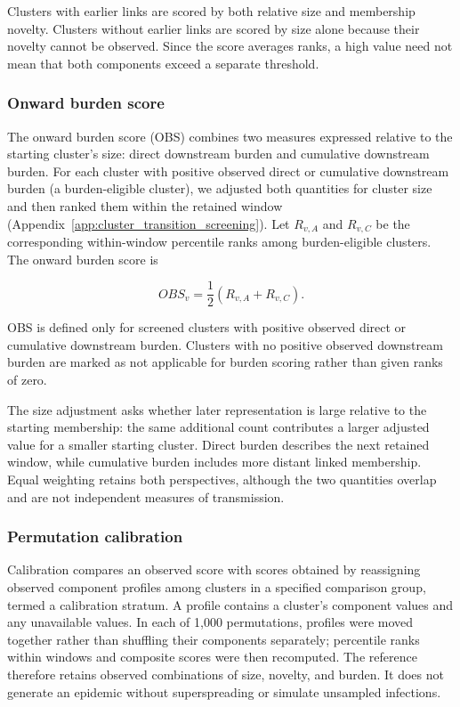 Clusters with earlier links are scored by both relative size and membership novelty. Clusters without earlier links are scored by size alone because their novelty cannot be observed. Since the score averages ranks, a high value need not mean that both components exceed a separate threshold.

\subsubsection*{Onward burden score}

The onward burden score (OBS) combines two measures expressed relative to the starting cluster's size: direct downstream burden and cumulative downstream burden. For each cluster with positive observed direct or cumulative downstream burden (a burden-eligible cluster), we adjusted both quantities for cluster size and then ranked them within the retained window (Appendix~\ref{app:cluster_transition_screening}). Let $R_{v,A}$ and $R_{v,C}$ be the corresponding within-window percentile ranks among burden-eligible clusters. The onward burden score is

\nopagebreak[4]
\[
    OBS_v = \frac{1}{2} \left( R_{v,A} + R_{v,C} \right).
\]

OBS is defined only for screened clusters with positive observed direct or cumulative downstream burden. Clusters with no positive observed downstream burden are marked as not applicable for burden scoring rather than given ranks of zero.

The size adjustment asks whether later representation is large relative to the starting membership: the same additional count contributes a larger adjusted value for a smaller starting cluster. Direct burden describes the next retained window, while cumulative burden includes more distant linked membership. Equal weighting retains both perspectives, although the two quantities overlap and are not independent measures of transmission.

\subsubsection*{Permutation calibration}

Calibration compares an observed score with scores obtained by reassigning observed component profiles among clusters in a specified comparison group, termed a calibration stratum. A profile contains a cluster's component values and any unavailable values. In each of 1,000 permutations, profiles were moved together rather than shuffling their components separately; percentile ranks within windows and composite scores were then recomputed. The reference therefore retains observed combinations of size, novelty, and burden. It does not generate an epidemic without superspreading or simulate unsampled infections.

